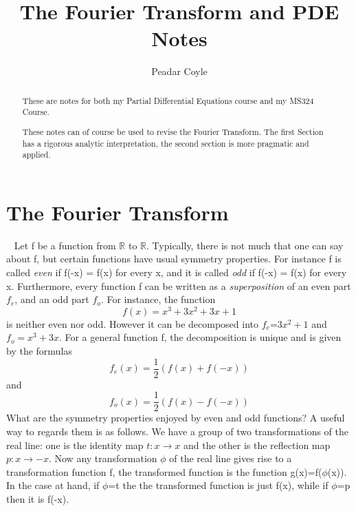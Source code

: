 \documentclass[a4paper,10pt]{article}
\title{The Fourier Transform and PDE Notes}
\author{Peadar Coyle}
\numberwithin{equation}{section}
\numberwithin{figure}{section}
\theoremstyle{plain}
\begin{document}
\maketitle

\begin{abstract}
These are notes for both my Partial Differential Equations course and my MS324 Course.

These notes can of course be used to revise the Fourier Transform. 
The first Section has a rigorous analytic interpretation, the second section is more pragmatic and applied.

\end{abstract}
\section{The Fourier Transform}~\cite{Princeton}
Let f be a function from $\mathbb{R}$ to $\mathbb{R}$. Typically, there is not much that one can
say about f, but certain functions have usual symmetry properties. For instance f is called \textit{even}
if f(-x) = f(x) for every x, and it is called \textit{odd} if f(-x) = f(x) for every x.
Furthermore, every function f can be written as a \textit{superposition} of an even part $f_{e}$, and an
odd part $f_{o}$.
For instance, the function \begin{displaymath}
                            f(x) = x^{3}+3x^{2}+3x+1
                           \end{displaymath}
 is neither even nor odd. However it can be decomposed into $f_{e}$=$3x^{2}+1$ and $
                                    f_{o}=x^{3}+3x.$
For a general function f, the decomposition is unique and is given by the formulas
\begin{displaymath}
 f_{e}(x)=\frac{1}{2}(f(x)+f(-x))
\end{displaymath}
and
\begin{displaymath}
 f_{o}(x)=\frac{1}{2}(f(x) - f(-x))
\end{displaymath}
What are the symmetry properties enjoyed by even and odd functions?
A useful way to regards them is as follows. We have a group of two transformations of the real line:
one is the identity map $t: x \rightarrow x$ and the other is the reflection map $p: x \rightarrow -x$.
Now any transformation $\phi$ of the real line gives rise to a transformation function f, the transformed
function is the function g(x)=f($\phi$(x)). In the case at hand, if $\phi$=t the the transformed function is
just f(x), while if $\phi$=p then it is f(-x).
\end{document}
